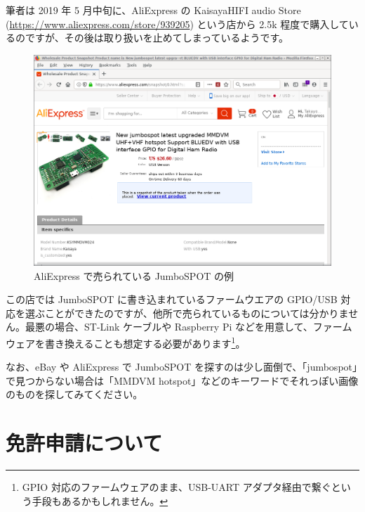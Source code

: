 \documentclass[a4j,oneside]{ujbook}
\begin{document}
筆者は 2019 年 5 月中旬に、AliExpress の KaisayaHIFI audio Store (\url{https://www.aliexpress.com/store/939205}) という店から \yen2.5k 程度で購入しているのですが、その後は取り扱いを止めてしまっているようです。
\begin{figure}[H]
 \centering
 \includegraphics[width=15cm]{img/jumbospot-aliexpress.png}
 \caption{AliExpress で売られている JumboSPOT の例}
\end{figure}
この店では JumboSPOT に書き込まれているファームウエアの GPIO/USB 対応を選ぶことができたのですが、他所で売られているものについては分かりません。最悪の場合、ST-Link ケーブルや Raspberry Pi などを用意して、ファームウェアを書き換えることも想定する必要があります\footnote{GPIO 対応のファームウェアのまま、USB-UART アダプタ経由で繋ぐという手段もあるかもしれません。}。

なお、eBay や AliExpress で JumboSPOT を探すのは少し面倒で、「jumbospot」で見つからない場合は「MMDVM hotspot」などのキーワードでそれっぽい画像のものを探してみてください。

\section{免許申請について}
\end{document}
